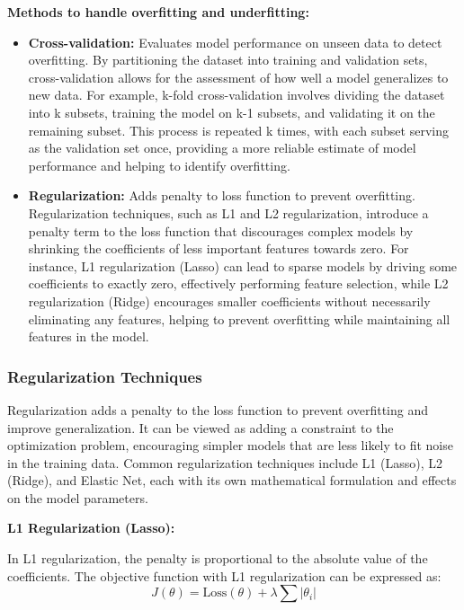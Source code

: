 \documentclass[
  letterpaper,
  DIV=11,
  numbers=noendperiod]{scrreprt}
\begin{document}
\textbf{Methods to handle overfitting and underfitting:}

\begin{itemize}
\item
  \textbf{Cross-validation:} Evaluates model performance on unseen data
  to detect overfitting. By partitioning the dataset into training and
  validation sets, cross-validation allows for the assessment of how
  well a model generalizes to new data. For example, k-fold
  cross-validation involves dividing the dataset into k subsets,
  training the model on k-1 subsets, and validating it on the remaining
  subset. This process is repeated k times, with each subset serving as
  the validation set once, providing a more reliable estimate of model
  performance and helping to identify overfitting.
\item
  \textbf{Regularization:} Adds penalty to loss function to prevent
  overfitting. Regularization techniques, such as L1 and L2
  regularization, introduce a penalty term to the loss function that
  discourages complex models by shrinking the coefficients of less
  important features towards zero. For instance, L1 regularization
  (Lasso) can lead to sparse models by driving some coefficients to
  exactly zero, effectively performing feature selection, while L2
  regularization (Ridge) encourages smaller coefficients without
  necessarily eliminating any features, helping to prevent overfitting
  while maintaining all features in the model.
\end{itemize}

\subsubsection{Regularization
Techniques}\label{regularization-techniques}

Regularization adds a penalty to the loss function to prevent
overfitting and improve generalization. It can be viewed as adding a
constraint to the optimization problem, encouraging simpler models that
are less likely to fit noise in the training data. Common regularization
techniques include L1 (Lasso), L2 (Ridge), and Elastic Net, each with
its own mathematical formulation and effects on the model parameters.

\textbf{L1 Regularization (Lasso):}

In L1 regularization, the penalty is proportional to the absolute value
of the coefficients. The objective function with L1 regularization can
be expressed as: \[
J(\theta) = \text{Loss}(\theta) + \lambda \sum |\theta_i|
\]
\end{document}

